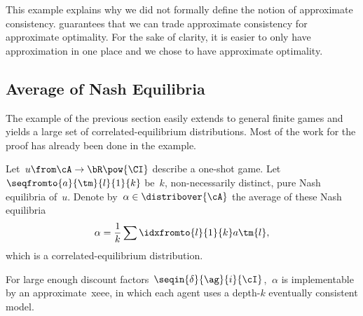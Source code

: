 This example explains why we did not formally define the notion of approximate consistency.
 guarantees that we can trade approximate consistency for approximate optimality.
For the sake of clarity, it is easier to only have approximation in one place and we chose to have approximate optimality.

\subsection{Average of Nash Equilibria}

The example of the previous section easily extends to general finite games and yields a large set of correlated-equilibrium distributions.
Most of the work for the proof has already been done in the example.

\begin{theorem}
\label{res:xeee_and_ce}
Let~\(u \from \cA \to \bR\pow{\CI}\) describe a one-shot game.
Let~\(\seqfromto{a}{\tm}{l}{1}{k}\) be~\(k\), non-necessarily distinct, pure Nash equilibria of~\(u\).
Denote by~\(\alpha \in \distribover{\cA}\) the average of these Nash equilibria
\[
\alpha = \frac{1}{k} \sum\idxfromto{l}{1}{k} a\tm{l},
\]
which is a correlated-equilibrium distribution.

For large enough discount factors~\(\seqin{\delta}{\ag}{i}{\cI}\), \(~\alpha\) is implementable by an approximate~\ac{xeee}, in which each agent uses a depth-\(k\) eventually consistent model.
\end{theorem}

